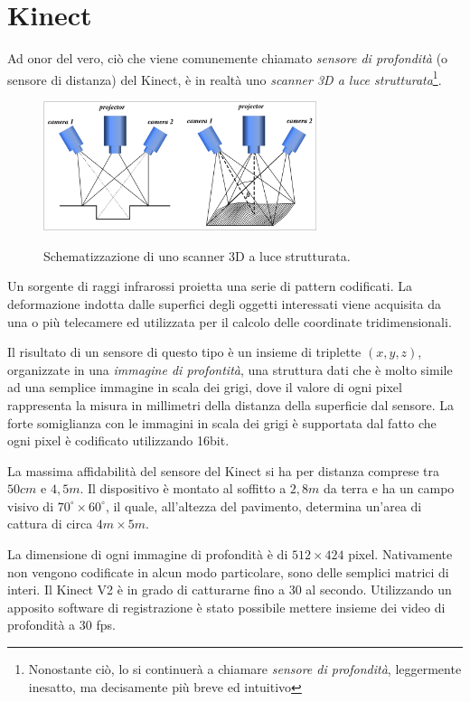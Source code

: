 \chapter{Kinect}
\label{chap:Kinect}

Ad onor del vero, ciò che viene comunemente chiamato \emph{sensore di profondità} (o sensore di distanza) del Kinect, è in realtà uno \emph{scanner 3D a luce strutturata}\footnote{Nonostante ciò, lo si continuerà a chiamare \emph{sensore di profondità}, leggermente inesatto, ma decisamente più breve ed intuitivo}.
\begin{figure}
    \centering
    \includegraphics[width=8cm]{img/3d-structured-light-scanner.png}
    \label{fig:structured_light_scanner}
    \caption{Schematizzazione di uno scanner 3D a luce strutturata.}
\end{figure}
Un sorgente di raggi infrarossi proietta una serie di pattern codificati. La deformazione indotta dalle superfici degli oggetti interessati viene acquisita da una o più telecamere ed utilizzata per il calcolo delle coordinate tridimensionali.

Il risultato di un sensore di questo tipo è un insieme di triplette $(x,y,z)$, organizzate in una \emph{immagine di profontità}, una struttura dati che è molto simile ad una semplice immagine in scala dei grigi, dove il valore di ogni pixel rappresenta la misura in millimetri della distanza della superficie dal sensore.
La forte somiglianza con le immagini in scala dei grigi è supportata dal fatto che ogni pixel è codificato utilizzando 16bit.

La massima affidabilità del sensore del Kinect si ha per distanza comprese tra $50cm$ e $4,5m$.
Il dispositivo è montato al soffitto a $2,8m$ da terra e ha un campo visivo di $70^{\circ} \times 60^{\circ}$, il quale, all'altezza del pavimento, determina un'area di cattura di circa $4m \times 5m$.

La dimensione di ogni immagine di profondità è di $512 \times 424$ pixel. Nativamente non vengono codificate in alcun modo particolare, sono delle semplici matrici di interi.
Il Kinect V2 è in grado di catturarne fino a 30 al secondo. Utilizzando un apposito software di registrazione è stato possibile mettere insieme dei video di profondità a 30 fps.
